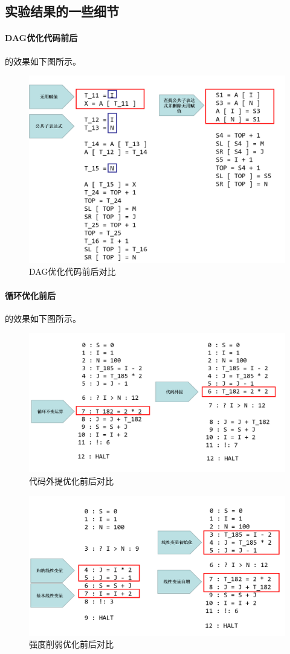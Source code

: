 \documentclass[cn,black,11pt,normal]{elegantnote}
\begin{document}
\subsection{实验结果的一些细节}

\paragraph{DAG优化代码前后} 的效果如下图所示。

\begin{figure}[H]
    \centering
    \includegraphics[width=0.8\linewidth]{image/res_dag.png}
    \caption{DAG优化代码前后对比}
\end{figure}

\paragraph{循环优化前后} 的效果如下图所示。

\begin{figure}[H]
    \centering
    \includegraphics[width=0.8\linewidth]{image/res_loop.png}
    \caption{代码外提优化前后对比}
\end{figure}
\begin{figure}[H]
    \centering
    \includegraphics[width=0.8\linewidth]{image/res_for.png}
    \caption{强度削弱优化前后对比}
\end{figure}
\end{document}

